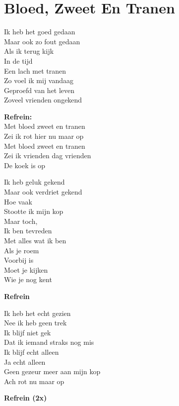 \section{Bloed, Zweet En Tranen}
Ik heb het goed gedaan\\
Maar ook zo fout gedaan\\
Als ik terug kijk\\
In de tijd\\
Een lach met tranen\\
Zo voel ik mij vandaag\\
Geproefd van het leven\\
Zoveel vrienden ongekend

\textbf{Refrein:}\\
Met bloed zweet en tranen\\
Zei ik rot hier nu maar op\\
Met bloed zweet en tranen\\
Zei ik vrienden dag vrienden\\
De koek is op

Ik heb geluk gekend\\
Maar ook verdriet gekend\\
Hoe vaak\\
Stootte ik mijn kop\\
Maar toch,\\
Ik ben tevreden\\
Met alles wat ik ben\\
Als je roem\\
Voorbij is\\
Moet je kijken\\
Wie je nog kent

\textbf{Refrein}

Ik heb het echt gezien\\
Nee ik heb geen trek\\
Ik blijf niet gek\\
Dat ik iemand straks nog mis\\
Ik blijf echt alleen\\
Ja echt alleen\\
Geen gezeur meer aan mijn kop\\
Ach rot nu maar op

\textbf{Refrein (2x)}
